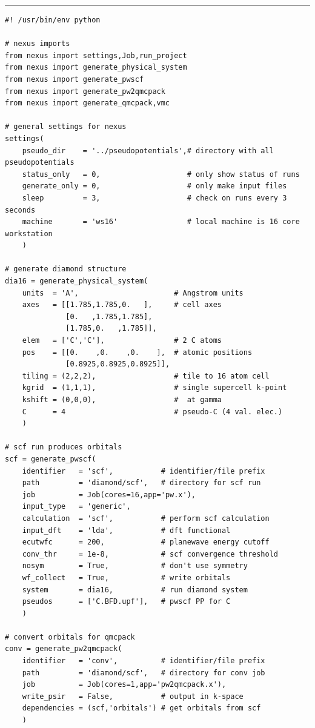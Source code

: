 \documentclass[oneside,11pt]{memoir}
\numberwithin{equation}{section}
\newcommand{\HRule}{\rule{\linewidth}{0.5mm}}
\begin{document}
\HRule
\begin{verbatim}
#! /usr/bin/env python

# nexus imports
from nexus import settings,Job,run_project
from nexus import generate_physical_system
from nexus import generate_pwscf
from nexus import generate_pw2qmcpack
from nexus import generate_qmcpack,vmc

# general settings for nexus
settings(
    pseudo_dir    = '../pseudopotentials',# directory with all pseudopotentials
    status_only   = 0,                    # only show status of runs
    generate_only = 0,                    # only make input files
    sleep         = 3,                    # check on runs every 3 seconds
    machine       = 'ws16'                # local machine is 16 core workstation
    )

# generate diamond structure
dia16 = generate_physical_system(
    units  = 'A',                      # Angstrom units
    axes   = [[1.785,1.785,0.   ],     # cell axes
              [0.   ,1.785,1.785],
              [1.785,0.   ,1.785]],
    elem   = ['C','C'],                # 2 C atoms
    pos    = [[0.    ,0.    ,0.    ],  # atomic positions
              [0.8925,0.8925,0.8925]],
    tiling = (2,2,2),                  # tile to 16 atom cell
    kgrid  = (1,1,1),                  # single supercell k-point
    kshift = (0,0,0),                  #  at gamma
    C      = 4                         # pseudo-C (4 val. elec.)
    )
              
# scf run produces orbitals
scf = generate_pwscf(
    identifier   = 'scf',           # identifier/file prefix
    path         = 'diamond/scf',   # directory for scf run
    job          = Job(cores=16,app='pw.x'),
    input_type   = 'generic',
    calculation  = 'scf',           # perform scf calculation
    input_dft    = 'lda',           # dft functional
    ecutwfc      = 200,             # planewave energy cutoff
    conv_thr     = 1e-8,            # scf convergence threshold
    nosym        = True,            # don't use symmetry
    wf_collect   = True,            # write orbitals
    system       = dia16,           # run diamond system
    pseudos      = ['C.BFD.upf'],   # pwscf PP for C
    )

# convert orbitals for qmcpack
conv = generate_pw2qmcpack(
    identifier   = 'conv',          # identifier/file prefix
    path         = 'diamond/scf',   # directory for conv job
    job          = Job(cores=1,app='pw2qmcpack.x'),
    write_psir   = False,           # output in k-space
    dependencies = (scf,'orbitals') # get orbitals from scf
    )


\end{verbatim}
\end{document}
